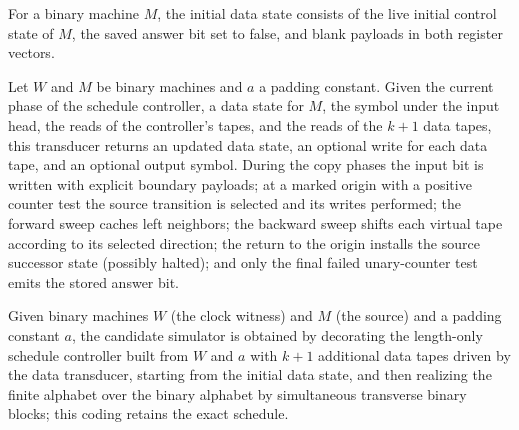 \begin{definition}
\label{Complexity.obliviousDataInit}
\leanok
{}
For a binary machine $M$, the initial data state consists of the live initial control
state of $M$, the saved answer bit set to false, and blank payloads in both register
vectors.
\end{definition}

\begin{definition}
\label{Complexity.obliviousVisit}
\leanok
{}
Let $W$ and $M$ be binary machines and $a$ a padding constant.  Given the current
phase of the schedule controller, a data state for $M$, the symbol under the input
head, the reads of the controller's tapes, and the reads of the $k+1$ data tapes, this
transducer returns an updated data state, an optional write for each data tape, and an
optional output symbol.  During the copy phases the input bit is written with explicit
boundary payloads; at a marked origin with a positive counter test the source
transition is selected and its writes performed; the forward sweep caches left
neighbors; the backward sweep shifts each virtual tape according to its selected
direction; the return to the origin installs the source successor state (possibly
halted); and only the final failed unary-counter test emits the stored answer bit.
\end{definition}

\begin{definition}
\label{Complexity.obliviousCandidate}
\leanok
{}
Given binary machines $W$ (the clock witness) and $M$ (the source) and a padding
constant $a$, the candidate simulator is obtained by decorating the length-only
schedule controller built from $W$ and $a$ with $k+1$ additional data tapes driven by
the data transducer, starting from the initial data state, and then realizing the
finite alphabet over the binary alphabet by simultaneous transverse binary blocks;
this coding retains the exact schedule.
\end{definition}

